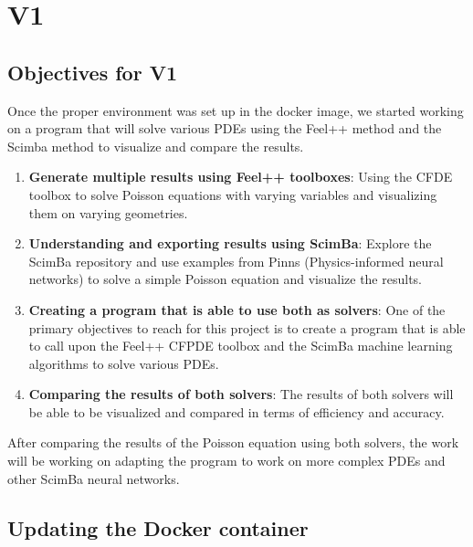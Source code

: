 \documentclass[12pt]{article}
\begin{document}
\newpage
\section{V1}  

\subsection{Objectives for V1}

Once the proper environment was set up in the docker image, we started working on a program that will solve various PDEs using the Feel++ method and the Scimba method to visualize and compare the results. 

\begin{enumerate}
    \item \textbf{Generate multiple results using Feel++ toolboxes}: Using the CFDE toolbox to solve Poisson equations with varying variables and visualizing them on varying geometries.
    
    \item \textbf{Understanding and exporting results using ScimBa}: Explore the ScimBa repository and use examples from Pinns (Physics-informed neural networks) to solve a simple Poisson equation and visualize the results.
    
    \item \textbf{Creating a program that is able to use both as solvers}: One of the primary objectives to reach for this project is to create a program that is able to call upon the Feel++ CFPDE toolbox and the ScimBa machine learning algorithms to solve various PDEs.
    
    \item \textbf{Comparing the results of both solvers}: The results of both solvers will be able to be visualized and compared in terms of efficiency and accuracy.
\end{enumerate}

After comparing the results of the Poisson equation using both solvers, the work will be working on adapting the program to work on more complex PDEs and other ScimBa neural networks. 




\newpage
\subsection{Updating the Docker container}
\end{document}

